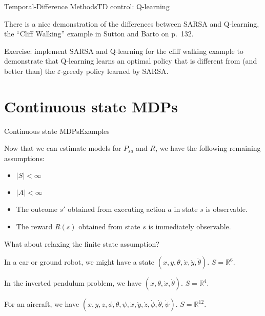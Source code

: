 \documentclass{beamer}
\def\Rset{\mathbb{R}}
\begin{document}
\begin{frame}{Temporal-Difference Methods}{TD control: Q-learning}

  There is a nice demonstration of the differences between SARSA and
  Q-learning, the ``Cliff Walking'' example in Sutton and Barto on
  p.\ 132.

  \medskip

  \alert{Exercise}: implement SARSA and Q-learning for the cliff walking
  example to demonstrate that Q-learning learns an optimal policy that is
  different from (and better than) the $\varepsilon$-greedy policy learned
  by SARSA.
  
\end{frame}


\section{Continuous state MDPs}

\begin{frame}{Continuous state MDPs}{Examples}

  Now that we can estimate models for $P_{sa}$ and $R$, we have
  the following remaining assumptions:
  \begin{itemize}
  \item $|S| < \infty$
  \item $|A| < \infty$
  \item The outcome $s'$ obtained from executing action $a$ in state
    $s$ is observable.
  \item The reward $R(s)$ obtained from state $s$ is immediately
    observable.
  \end{itemize}

  \medskip

  What about \alert{relaxing the finite state assumption}?

  \medskip

  In a car or ground robot, we might have a state
  $(x,y,\theta,\dot{x},\dot{y},\dot{\theta})$. $S = \Rset^6$.

  \medskip

  In the inverted pendulum problem, we have
  $(x,\theta,\dot{x},\dot{\theta})$. $S=\Rset^4$.

  \medskip

  For an aircraft, we have $(x,y,z,\phi,\theta,\psi,\dot{x},\dot{y},\dot{z},\dot{\phi},\dot{\theta},\dot{\psi})$. $S = \Rset^{12}$.

\end{frame}
\end{document}
